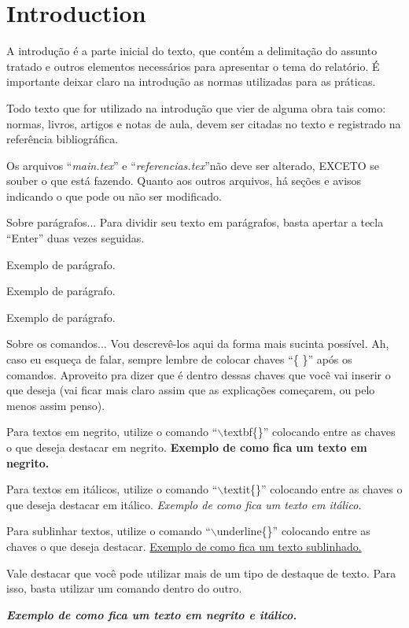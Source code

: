 \chapter{Introduction}
\label{chapter:introduction}
A introdução é a parte inicial do texto, que contém a delimitação do assunto tratado e outros elementos necessários para apresentar o tema do relatório. É importante deixar claro na introdução as normas utilizadas para as práticas.

Todo texto que for utilizado na introdução que vier de alguma obra tais como: normas, livros, artigos e notas de aula, devem ser citadas no texto e registrado na referência bibliográfica.

Os arquivos ``\textit{main.tex}'' e ``\textit{referencias.tex}''não deve ser alterado, EXCETO se souber o que está fazendo. Quanto aos outros arquivos, há seções e avisos indicando o que pode ou não ser modificado.

Sobre parágrafos... Para dividir seu texto em parágrafos, basta apertar a tecla ``Enter'' duas vezes seguidas.

Exemplo de parágrafo.

Exemplo de parágrafo.

Exemplo de parágrafo.

Sobre os comandos... Vou descrevê-los aqui da forma mais sucinta possível. Ah, caso eu esqueça de falar, sempre lembre de colocar chaves ``\{ \}'' após os comandos. Aproveito pra dizer que é dentro dessas chaves que você vai inserir o que deseja (vai ficar mais claro assim que as explicações começarem, ou pelo menos assim penso).

Para textos em negrito, utilize o comando ``$\backslash$textbf\{\}'' colocando entre as chaves o que deseja destacar em negrito. \textbf{Exemplo de como fica um texto em negrito.}

Para textos em itálicos, utilize o comando ``$\backslash$textit\{\}'' colocando entre as chaves o que deseja destacar em itálico. \textit{Exemplo de como fica um texto em itálico.}

Para sublinhar textos, utilize o comando ``$\backslash$underline\{\}'' colocando entre as chaves o que deseja destacar. \underline{Exemplo de como fica um texto sublinhado.}

Vale destacar que você pode utilizar mais de um tipo de destaque de texto. Para isso, basta utilizar um comando dentro do outro.

\textbf{\textit{Exemplo de como fica um texto em negrito e itálico.}}

